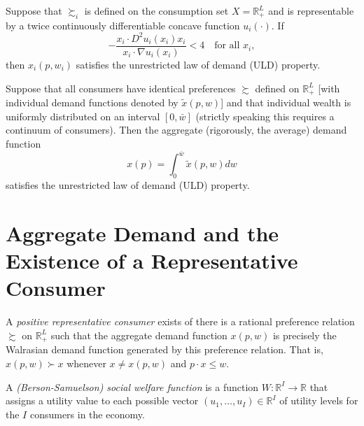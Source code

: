 \begin{prop}
    Suppose that $\succsim_i$ is defined on the consumption set $X = \mathbb{R}^L_+$ and is representable by a twice continuously differentiable concave function $u_i(\cdot)$. If 
    \begin{equation*}
        - \frac{x_i \cdot D^2 u_i(x_i) x_i}{x_i \cdot \nabla u_i(x_i)} < 4 \quad \text{for all } x_i,
    \end{equation*}
    then $x_i(p, w_i)$ satisfies the unrestricted law of demand (ULD) property.
\end{prop}

\begin{prop}
    Suppose that all consumers have identical preferences $\succsim$ defined on $\mathbb{R}^{L}_+$ [with individual demand functions denoted by $\tilde{x}(p, w)$] and that individual wealth is uniformly distributed on an interval $[0, \bar{w}]$ (strictly speaking this requires a continuum of consumers). Then the aggregate (rigorously, the average) demand function
    \begin{equation*}
        x(p) = \int_0^{\bar{w}} \tilde{x}(p, w) dw
    \end{equation*}
    satisfies the unrestricted law of demand (ULD) property.
\end{prop}


\section{Aggregate Demand and the Existence of a Representative Consumer}

\begin{defn}
    A \emph{positive representative consumer} exists of there is a rational preference relation $\succsim$ on $\mathbb{R}^{L}_+$ such that the aggregate demand function $x(p, w)$ is precisely the Walrasian demand function generated by this preference relation. That is, $x(p, w) \succ x$ whenever $x \neq x(p, w)$ and $p \cdot x \leq w$.
\end{defn}

\begin{defn}
    A \emph{(Berson-Samuelson) social welfare function} is a function $W: \mathbb{R}^{I} \to \mathbb{R}$ that assigns a utility value to each possible vector $(u_1, \dots, u_I) \in \mathbb{R}^{I}$ of utility levels for the $I$ consumers in the economy.
\end{defn}

